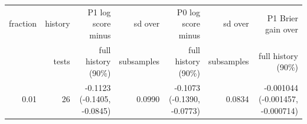 \begin{tabular}{rrrrrrr}
\toprule
fraction & history & P1 log score minus & sd over & P0 log score minus & sd over & P1 Brier gain over \\
 & tests & full history (90\%) & subsamples & full history (90\%) & subsamples & full history (90\%) \\
\midrule
0.01 & 26 & -0.1123 (-0.1405, -0.0845) & 0.0990 & -0.1073 (-0.1390, -0.0773) & 0.0834 & -0.001044 (-0.001457, -0.000714) \\

\end{tabular}
